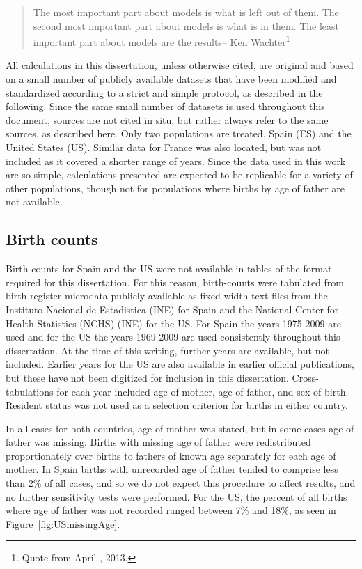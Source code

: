 \begin{singlespace}
\begin{quote}
The most important part about models is what is left out of them. The second
most important part about models is what is in them. The least important part
about models are the results-- Ken Wachter\footnote{Quote from April ,
2013.}
\end{quote}
\end{singlespace}

All calculations in this dissertation, unless otherwise cited, are original 
and based on a small number of publicly available datasets that have
been modified and standardized according to a strict and simple protocol, as
described in the following. Since the same small number of datasets
is used throughout this document, sources are not cited in situ, but rather
always refer to the same sources, as described here. Only two populations are
treated, Spain (ES) and the United States (US). Similar data for France was also
located, but was not included as it covered a shorter range of years. 
Since the data used in this work are so simple, calculations presented are
expected to be replicable for a variety of other populations, though not for
populations where births by age of father are not available.

\subsection{Birth counts}
Birth counts for Spain and the US were not available in tables of the format
required for this dissertation. For this reason, birth-counts were tabulated from birth
register microdata publicly available as fixed-width text files from the 
Instituto Nacional de Estadistica (INE)\citep{MNPnacimientos} for Spain and the
National Center for Health Statistics (NCHS) (INE)\citep{NCHS19692009} for the US. For Spain 
the years 1975-2009 are used and for the US the years 1969-2009 are used
consistently throughout this dissertation. At the time of this writing, further
years are available, but not included. Earlier years for the US are also
available in earlier official publications, but these have not been digitized
for inclusion in this dissertation. Cross-tabulations for each year included age
of mother, age of father, and sex of birth. Resident status was not used as a
selection criterion for births in either country.

In all cases for both countries, age of mother was
stated, but in some cases age of father was missing. Births with missing age of
father were redistributed proportionately over births to fathers of known age 
separately for each age of mother. In Spain births with unrecorded age of father 
tended to comprise less than 2\% of
all cases, and so we do not expect this procedure to affect
results, and no further sensitivity tests were performed. For the US, the
percent of all births where age of father was not recorded ranged between 7\%
and 18\%, as seen in Figure~\ref{fig:USmissingAge}. 

